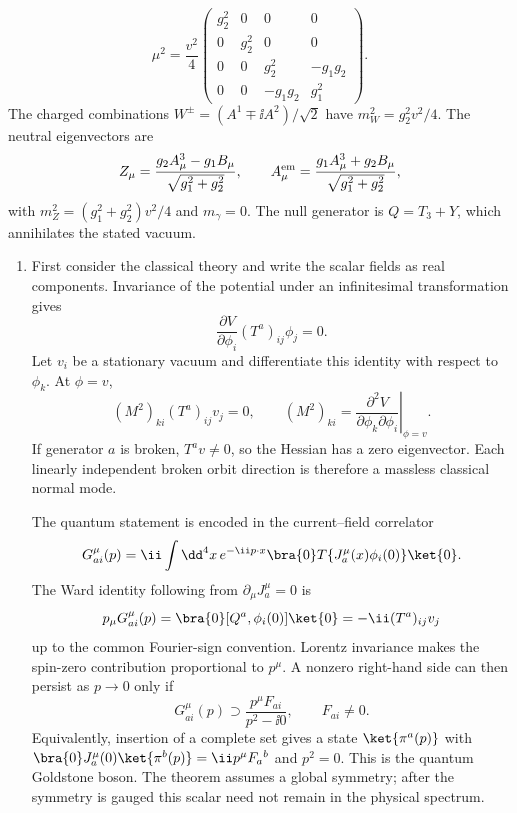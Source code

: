 \begin{enumerate}
\begin{enumerate}
\[      \boxed{\mu^2=\frac{v^2}{4}
      \begin{pmatrix}
        g_2^2&0&0&0\\
        0&g_2^2&0&0\\
        0&0&g_2^2&-g_1g_2\\
        0&0&-g_1g_2&g_1^2
      \end{pmatrix}.}
    \]
    The charged combinations
    \(W^\pm=(A^1\mp \ii A^2)/\sqrt2\) have
    \(m_W^2=g_2^2v^2/4\).  The neutral eigenvectors are
    \[
      Z_\mu=\frac{g_2A_\mu^3-g_1B_\mu}
        {\sqrt{g_1^2+g_2^2}},\qquad
      A_\mu^{\rm em}=\frac{g_1A_\mu^3+g_2B_\mu}
        {\sqrt{g_1^2+g_2^2}},
    \]
    with \(m_Z^2=(g_1^2+g_2^2)v^2/4\) and \(m_\gamma=0\).  The null
    generator is \(Q=T_3+Y\), which annihilates the stated vacuum.
  \end{enumerate}

  \begin{enumerate}
    \item[(a)]
    First consider the classical theory and write the scalar fields as
    real components.  Invariance of the potential under an infinitesimal
    transformation gives
    \[
      \frac{\partial V}{\partial\phi_i}
        (T^a)_{ij}\phi_j=0.
    \]
    Let \(v_i\) be a stationary vacuum and differentiate this identity
    with respect to \(\phi_k\).  At \(\phi=v\),
    \[
      (M^2)_{ki}(T^a)_{ij}v_j=0,\qquad
      (M^2)_{ki}
        =\left.\frac{\partial^2V}
          {\partial\phi_k\partial\phi_i}\right|_{\phi=v}.
    \]
    If generator \(a\) is broken, \(T^av\ne0\), so the Hessian has a
    zero eigenvector.  Each linearly independent broken orbit direction
    is therefore a massless classical normal mode.

    The quantum statement is encoded in the current--field correlator
    \[
      G^\mu_{ai}(p)=\ii\int \dd^4x\,e^{-\ii p\cdot x}
        \bra{0}T\{J^\mu_a(x)\phi_i(0)\}\ket{0} .
    \]
    The Ward identity following from \(\partial_\mu J^\mu_a=0\) is
    \[
      p_\mu G^\mu_{ai}(p)
        =\bra{0}[Q^a,\phi_i(0)]\ket{0}
        =-\ii(T^a)_{ij}v_j
    \]
    up to the common Fourier-sign convention.  Lorentz invariance makes
    the spin-zero contribution proportional to \(p^\mu\).  A nonzero
    right-hand side can then persist as \(p\to0\) only if
    \[
      G^\mu_{ai}(p)\supset
        \frac{p^\mu F_{ai}}{p^2-\ii0},
        \qquad F_{ai}\ne0.
    \]
    Equivalently, insertion of a complete set gives a state
    \(\ket{\pi^a(p)}\) with
    \(\bra{0}J^\mu_a(0)\ket{\pi^b(p)}
      =\ii p^\mu F_a{}^b\) and \(p^2=0\).  This is the quantum Goldstone
    boson.  The theorem assumes a global symmetry; after the symmetry is
    gauged this scalar need not remain in the physical spectrum.


\end{enumerate}
\end{enumerate}
